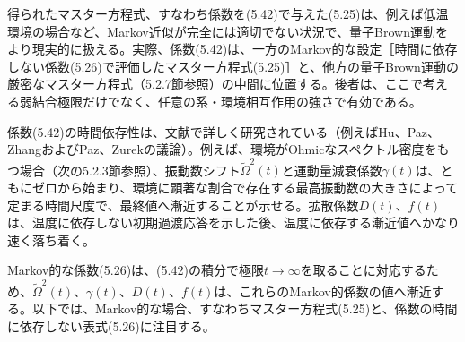 得られたマスター方程式、すなわち係数を(5.42)で与えた(5.25)は、例えば低温環境の場合など、Markov近似が完全には適切でない状況で、量子Brown運動をより現実的に扱える\cite{ref109,ref220}。実際、係数(5.42)は、一方のMarkov的な設定［時間に依存しない係数(5.26)で評価したマスター方程式(5.25)］と、他方の量子Brown運動の厳密なマスター方程式（5.2.7節参照）の中間に位置する。後者は、ここで考える弱結合極限だけでなく、任意の系・環境相互作用の強さで有効である。

係数(5.42)の時間依存性は、文献で詳しく研究されている（例えばHu、Paz、Zhang\cite{ref219}およびPaz、Zurek\cite{ref015}の議論）。例えば、環境がOhmicなスペクトル密度をもつ場合（次の5.2.3節参照）、振動数シフト$\widetilde\Omega^2(t)$と運動量減衰係数$\gamma(t)$は、ともにゼロから始まり、環境に顕著な割合で存在する最高振動数の大きさによって定まる時間尺度で、最終値へ漸近することが示せる。拡散係数$D(t)$、$f(t)$は、温度に依存しない初期過渡応答を示した後、温度に依存する漸近値へかなり速く落ち着く。

Markov的な係数(5.26)は、(5.42)の積分で極限$t\longrightarrow\infty$を取ることに対応するため、$\widetilde\Omega^2(t)$、$\gamma(t)$、$D(t)$、$f(t)$は、これらのMarkov的係数の値へ漸近する。以下では、Markov的な場合、すなわちマスター方程式(5.25)と、係数の時間に依存しない表式(5.26)に注目する。
